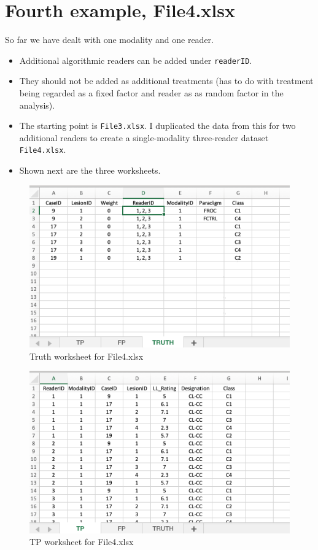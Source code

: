 \documentclass[
]{book}
\providecommand{\tightlist}{%
  \setlength{\itemsep}{0pt}\setlength{\parskip}{0pt}}
\begin{document}
\hypertarget{classification-tasks-example4}{%
\section{Fourth example, File4.xlsx}\label{classification-tasks-example4}}

So far we have dealt with one modality and one reader.

\begin{itemize}
\tightlist
\item
  Additional algorithmic readers can be added under \texttt{readerID}.
\item
  They should not be added as additional treatments (has to do with treatment being regarded as a fixed factor and reader as as random factor in the analysis).
\item
  The starting point is \texttt{File3.xlsx}. I duplicated the data from this for two additional readers to create a single-modality three-reader dataset \texttt{File4.xlsx}.
\item
  Shown next are the three worksheets.
\end{itemize}

\begin{figure}

{\centering \includegraphics[width=0.5\linewidth,height=0.2\textheight]{images/classification/File4Truth} 

}

\caption{Truth worksheet for File4.xlsx}\label{fig:File4Truth}
\end{figure}

\begin{figure}

{\centering \includegraphics[width=0.5\linewidth,height=0.2\textheight]{images/classification/File4TP} 

}

\caption{TP worksheet for File4.xlsx}\label{fig:File4TP}
\end{figure}
\end{document}
